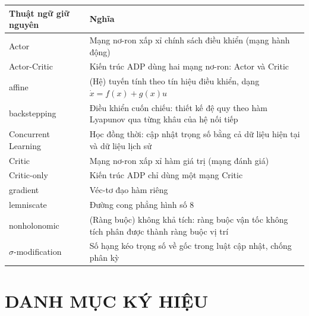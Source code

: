 \documentclass[12pt,a4paper]{article}
\begin{document}
\begin{table}[H]
\centering
\begin{tabular}{lp{9.8cm}}
\toprule
\textbf{Thuật ngữ giữ nguyên} & \textbf{Nghĩa} \\
\midrule
Actor               & Mạng nơ-ron xấp xỉ chính sách điều khiển (mạng hành động) \\
Actor-Critic        & Kiến trúc ADP dùng hai mạng nơ-ron: Actor và Critic \\
affine              & (Hệ) tuyến tính theo tín hiệu điều khiển, dạng $\dot x = f(x) + g(x)u$ \\
backstepping        & Điều khiển cuốn chiếu: thiết kế đệ quy theo hàm Lyapunov qua từng khâu của hệ nối tiếp \\
Concurrent Learning & Học đồng thời: cập nhật trọng số bằng cả dữ liệu hiện tại và dữ liệu lịch sử \\
Critic              & Mạng nơ-ron xấp xỉ hàm giá trị (mạng đánh giá) \\
Critic-only         & Kiến trúc ADP chỉ dùng một mạng Critic \\
gradient            & Véc-tơ đạo hàm riêng \\
lemniscate          & Đường cong phẳng hình số 8 \\
nonholonomic        & (Ràng buộc) không khả tích: ràng buộc vận tốc không tích phân được thành ràng buộc vị trí \\
$\sigma$-modification & Số hạng kéo trọng số về gốc trong luật cập nhật, chống phân kỳ \\
\bottomrule
\end{tabular}
\end{table}

\newpage
\section*{DANH MỤC KÝ HIỆU}
\end{document}
